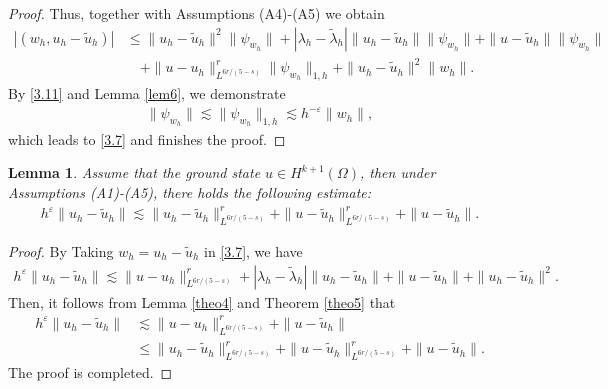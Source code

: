 \documentclass[compress, preprint,9pt]{elsarticle}
\numberwithin{equation}{section}
\newtheorem{lemma}{Lemma}[section]
\newcommand{\eps}{\varepsilon}
\begin{document}
\begin{proof}
	Thus, together with Assumptions (A4)-(A5) we obtain
	\begin{eqnarray*}
		|(w_h,u_h-\widetilde{u}_h)|&\le \|u_h-\widetilde{u}_h\|^2\|\psi_{w_h}\|+|\lambda_h -\widetilde{\lambda}_h|\|u_h-\widetilde{u}_h\|\|\psi_{w_h}\|+\|u-\widetilde{u}_h\|\|\psi_{w_h}\|
		\\
		&\quad+\|u-u_h\|_{L^{6r/(5-s)}}^r\|\psi_{w_h}\|_{1,h}+\|u_h-\widetilde{u}_h\|^2\|w_h\|.
	\end{eqnarray*}
	By \eqref{3.11} and Lemma \ref{lem6}, we demonstrate
	\begin{eqnarray*}
		\|\psi_{w_h}\|\lesssim\|\psi_{w_h}\|_{1,h}\lesssim h^{-\eps}\|w_h\|,
	\end{eqnarray*}
	which leads to \eqref{3.7} and finishes the proof.	
\end{proof}


\begin{lemma}\label{coro3.3}
	Assume that the ground state $u\in H^{k+1}(\Omega)$, then under Assumptions (A1)-(A5), there holds the following estimate:
	\begin{eqnarray*}
		h^\eps\|u_h-\widetilde{u}_h\|\lesssim \|u_h-\widetilde{u}_h\|^r_{L^{6r/(5-s)}}+\|u-\widetilde{u}_h\|^r_{L^{6r/(5-s)}}+\|u-\widetilde{u}_h\|.
	\end{eqnarray*}
\end{lemma}
\begin{proof}
	By Taking $w_h=u_h-\widetilde{u}_h$ in \eqref{3.7}, we have
	\begin{equation*}
		\begin{aligned}
			h^\eps\|u_h-\widetilde{u}_h\|\lesssim \|u-u_h\|^r_{L^{6r/(5-s)}}+|\lambda_h-\widetilde{\lambda}_h|\|u_h-\widetilde{u}_h\|+\|u-\widetilde{u}_h\|+\|u_h-\widetilde{u}_h\|^2.
		\end{aligned}
	\end{equation*}
	Then, it follows from Lemma \ref{theo4} and Theorem \ref{theo5} that
	\begin{eqnarray*}
		h^\eps\|u_h-\widetilde{u}_h\|&\lesssim \|u-u_h\|^r_{L^{6r/(5-s)}}+\|u-\widetilde{u}_h\|\\
		&\le\|u_h-\widetilde{u}_h\|^r_{L^{6r/(5-s)}}+\|u-\widetilde{u}_h\|^r_{L^{6r/(5-s)}}+\|u-\widetilde{u}_h\|.
	\end{eqnarray*}
	The proof is completed.
\end{proof}
\end{document}

